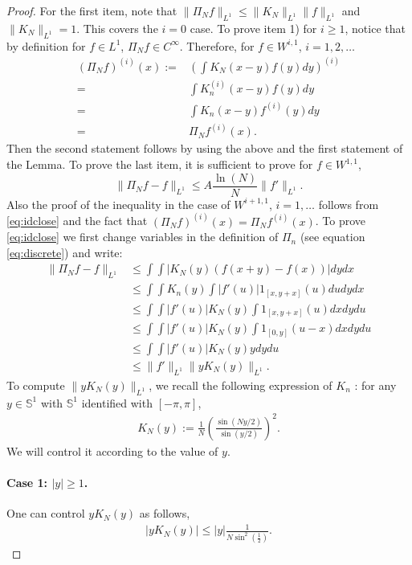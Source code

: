 \documentclass[12pt]{article}
\theoremstyle{plain}
\begin{document}
\begin{proof}
For the first item, note that
$\|\Pi_N f\|_{L^1}\leq \|K_N\|_{L^1}\|f\|_{L^1}$ and $\|K_N\|_{L^1}= 1$. This covers the $i=0$ case. To prove item 1) for $i\ge 1$, notice that by definition for $f\in L^1$, $\Pi_N f \in C^{\infty}$. Therefore, for $f\in W^{i,1}$, $i=1,2,\dots$
\begin{align*}
(\Pi_N f)^{(i)}(x):=&\left(\int K_N(x-y)f(y)dy \right)^{(i)}\\
=&\int K_n^{(i)}(x-y)f(y)dy\\
=&\int K_n(x-y)f^{(i)}(y)dy\\
=&\Pi_N f^{(i)}(x).
\end{align*} 
Then the second statement follows by using the above and the first statement of the Lemma. To prove the last item, it is sufficient to prove  for $f\in W^{1,1}$,
\begin{equation}\label{eq:idclose}
\|\Pi_N f-f\|_{L^1}\leq A\frac{\ln(N)}{N} \|f'\|_{L^1}.
\end{equation} 
Also the proof of the inequality in the case of $W^{i+1,1}$, $i=1, \dots$ follows from \eqref{eq:idclose} and the fact that $(\Pi_N f)^{(i)}(x)=\Pi_N f^{(i)}(x)$. To prove \eqref{eq:idclose} we first change variables in the definition of $\Pi_n$ (see equation \eqref{eq:discrete}) and write: 
\begin{align*}
\|\Pi_N f-f\|_{L^1}&\leq \int \int |K_N (y)(f(x+y)-f(x))|dydx\\
&\leq \int \int K_n (y)\int |f'(u)|1_{[x,y+x]}(u)dudydx\\
&\leq \int \int |f'(u)|K_N (y)\int 1_{[x,y+x]}(u)dxdydu\\
&\leq \int \int |f'(u)|K_N (y)\int 1_{[0,y]}(u-x)dxdydu\\
&\leq \int \int |f'(u)|K_N (y)ydydu\\
&\leq \|f'\|_{L^1}\|yK_N (y)\|_{L^1}.
\end{align*}
To compute $\|yK_N (y)\|_{L^1}$, we recall the following expression of $K_n$ : for any $y\in \mathbb S^1$ with $\mathbb S^1$ identified with $[-\pi,\pi]$,
\begin{align*}
K_N(y):=\frac1N\left(\frac{\sin(Ny/2)}{\sin(y/2)}\right)^2.
\end{align*}
We will control it according to the value of $y$.
\paragraph{Case 1: $ |y|\geq 1$.}
One can control $yK_N(y)$ as follows,
\begin{align*}
    |yK_N(y)|\leq |y|\frac{ 1}{N\sin^{2}(\frac 1 2)}.
\end{align*}

\end{proof}
\end{document}
